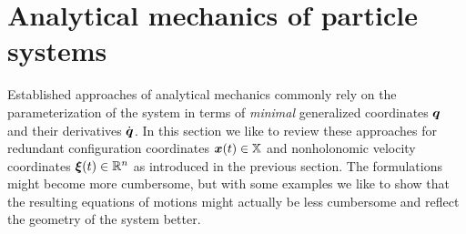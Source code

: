 \chapter{Analytical mechanics of particle systems}

Established approaches of analytical mechanics commonly rely on the parameterization of the system in terms of \textit{minimal} generalized coordinates $\boldsymbol{q}$ and their derivatives $\dot{\boldsymbol{q}}$.
In this section we like to review these approaches for redundant configuration coordinates $\boldsymbol{x}(t) \in \mathbb{X}$ and nonholonomic velocity coordinates $\boldsymbol{\xi}(t)\in\mathbb{R}^n$ as introduced in the previous section.
The formulations might become more cumbersome, but with some examples we like to show that the resulting equations of motions might actually be less cumbersome and reflect the geometry of the system better.


